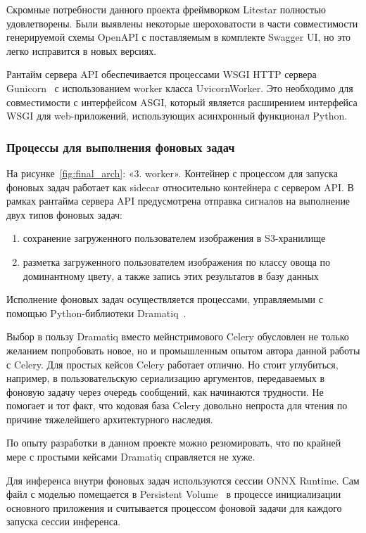 \documentclass[a4paper,12pt]{extarticle}
\begin{document}
Скромные потребности данного проекта фреймворком Litestar полностью удовлетворены. Были выявлены
некоторые шероховатости в части совместимости генерируемой схемы OpenAPI с поставляемым в комплекте
Swagger UI, но это легко исправится в новых версиях.

Рантайм сервера API обеспечивается процессами WSGI HTTP сервера Gunicorn~\cite{gunicorn} с
использованием worker класса UvicornWorker. Это необходимо для совместимости с интерфейсом ASGI,
который является расширением интерфейса WSGI для web-приложений, использующих асинхронный функционал
Python.

\subsubsection{Процессы для выполнения фоновых задач}

На рисунке~\ref{fig:final_arch}: «3. worker». Контейнер с процессом для запуска фоновых задач
работает как sidecar относительно контейнера с сервером API. В рамках рантайма сервера API
предусмотрена отправка сигналов на выполнение двух типов фоновых задач:

\begin{enumerate}
	\item сохранение загруженного пользователем изображения в S3-хранилище
	\item разметка загруженного пользователем изображения по классу овоща по доминантному цвету,
	а также запись этих результатов в базу данных
\end{enumerate}

Исполнение фоновых задач осуществляется процессами, управляемыми с помощью Python-библиотеки
Dramatiq~\cite{dramatiq}.

Выбор в пользу Dramatiq вместо мейнстримового Celery обусловлен не только желанием попробовать новое,
но и промышленным опытом автора данной работы с Celery. Для простых кейсов Celery работает отлично.
Но стоит углубиться, например, в пользовательскую сериализацию аргументов, передаваемых в фоновую
задачу через очередь сообщений, как начинаются трудности. Не помогает и тот факт, что кодовая база
Celery довольно непроста для чтения по причине тяжелейшего архитектурного наследия.

По опыту разработки в данном проекте можно резюмировать, что по крайней мере с простыми кейсами
Dramatiq справляется не хуже.

Для инференса внутри фоновых задач используются сессии ONNX Runtime. Сам файл с моделью помещается в
Persistent Volume~\cite{pv} в процессе инициализации основного приложения и считывается процессом
фоновой задачи для каждого запуска сессии инференса.
\end{document}

